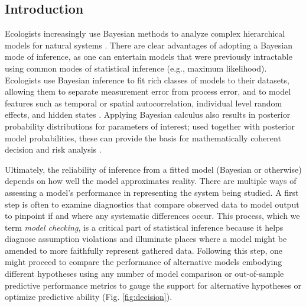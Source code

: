 \documentclass[12pt,english]{article}
\begin{document}
\begin{spacing}{1.9}
\def\VAR{{\rm Var}\,} \def\COV{{\rm Cov}\,} \def\Prob{{\rm P}\,}
\def\bfx{{\bf x}} \def\bfX{{\bf X}} \def\bfY{{\bf Y}\,} \def\bfy{{\bf
    y}} \def\bfZ{{\bf Z}\,} \def\bftheta{\boldsymbol{\theta}}
\def\bfeta{\boldsymbol{\eta}} \def\bfOmega{\boldsymbol{\Omega}}
\def\bfbeta{\boldsymbol{\beta}} \def\bfSigma{\boldsymbol{\Sigma}}
\def\bfmu{\boldsymbol{\mu}} \def\bfnu{\boldsymbol{\nu}}
\def\bfepsilon{\boldsymbol{\epsilon}} \def\R2{\rm I\!R^2}


\section{Introduction}

Ecologists increasingly use Bayesian methods to analyze complex
hierarchical models for natural systems \citep{HobbsHooten2015}.
There are clear advantages of adopting a Bayesian mode of inference,
as one can entertain models that were previously intractable using
common modes of statistical inference (e.g., maximum
likelihood). Ecologists use Bayesian inference to fit rich classes of
models to their datasets, allowing them to separate measurement error
from process error, and to model features such as temporal or spatial
autocorrelation, individual level random effects, and hidden states
\citep{LinkEtAl2002,ClarkBjornstad2004,CressieEtAl2009}. Applying
Bayesian calculus also results in posterior probability distributions
for parameters of interest; used together with posterior model
probabilities, these can provide the basis for mathematically coherent
decision and risk analysis \citep{LinkBarker2006,Berger2013,
  williams2016combining}.

Ultimately, the reliability of inference from a fitted model (Bayesian
or otherwise) depends on how well the model approximates reality.
There are multiple ways of assessing a model's performance in
representing the system being studied. A first step is often to
examine diagnostics that compare observed data to model output to
pinpoint if and where any systematic differences occur. This process,
which we term \textit{model checking}, is a critical part of
statistical inference because it helps diagnose assumption violations
and illuminate places where a model might be amended to more
faithfully represent gathered data. Following this step, one might
proceed to compare the performance of alternative models embodying
different hypotheses using any number of model comparison or
out-of-sample predictive performance metrics \citep[see][for a
review]{HootenHobbs2015} to gauge the support for alternative
hypotheses or optimize predictive ability (Fig. \ref{fig:decision}).


\end{spacing}
\end{document}
